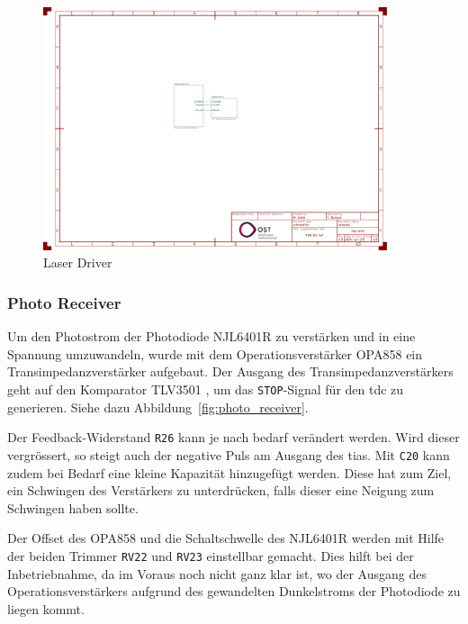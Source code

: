 
\begin{figure}[H]
    \centering
    \includegraphics[page=3, trim=100 520 550 60, clip, width=0.9\textwidth]{attachments/schematic.pdf}
    \caption{Laser Driver}\label{fig:laser_driver}
\end{figure}

\subsubsection{Photo Receiver}\label{sec:schematic_photo_receiver}

Um den Photostrom der Photodiode NJL6401R \cite{jrc2014njl6401r3_datasheet} zu verstärken und in eine Spannung umzuwandeln,
wurde mit dem Operationsverstärker OPA858 \cite{ti2018opa858_datasheet} ein Transimpedanzverstärker aufgebaut. Der
Ausgang des Transimpedanzverstärkers geht auf den Komparator TLV3501 \cite{ti2016tlv3501_datasheet}, um das \lstinline|STOP|-Signal
für den \acrshort{tdc} zu generieren. Siehe dazu Abbildung~\ref{fig:photo_receiver}.

Der Feedback-Widerstand \lstinline|R26| kann je nach bedarf verändert werden. Wird dieser vergrössert, so steigt auch der
negative Puls am Ausgang des \acrshort{tia}s. Mit \lstinline|C20| kann zudem bei Bedarf eine kleine Kapazität hinzugefügt
werden. Diese hat zum Ziel, ein Schwingen des Verstärkers zu unterdrücken, falls dieser eine Neigung zum Schwingen haben
sollte.

Der Offset des OPA858 und die Schaltschwelle des NJL6401R werden mit Hilfe der beiden Trimmer \lstinline|RV22| und
\lstinline|RV23| einstellbar gemacht. Dies hilft bei der Inbetriebnahme, da im Voraus noch nicht ganz klar ist,
wo der Ausgang des Operationsverstärkers aufgrund des gewandelten Dunkelstroms der Photodiode zu liegen kommt.

